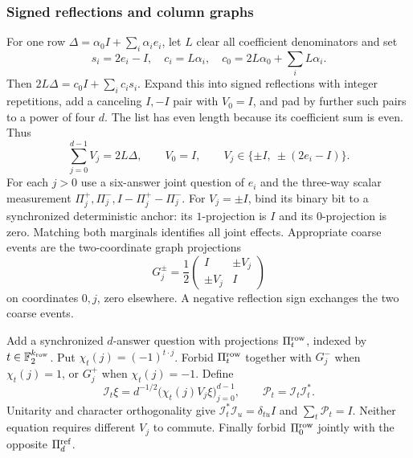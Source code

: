 \subsubsection{Signed reflections and column graphs}
For one row $\Delta=\alpha_0I+\sum_i\alpha_ie_i$, let $L$ clear all coefficient denominators and set
\[
 s_i=2e_i-I,\quad c_i=L\alpha_i,\quad
 c_0=2L\alpha_0+\sum_iL\alpha_i.
\]
Then $2L\Delta=c_0I+\sum_ic_is_i$. Expand this into signed reflections with integer repetitions, add a canceling $I,-I$ pair with $V_0=I$, and pad by further such pairs to a power of four $d$. The list has even length because its coefficient sum is even. Thus
\begin{equation}\label{eq:slots}
 \sum_{j=0}^{d-1}V_j=2L\Delta,\qquad V_0=I,\qquad
 V_j\in\{\pm I,\ \pm(2e_i-I)\}.
\end{equation}
For each $j>0$ use a six-answer joint question of $e_i$ and the three-way scalar measurement $\Pi_j^+,\Pi_j^-,I-\Pi_j^+-\Pi_j^-$. For $V_j=\pm I$, bind its binary bit to a synchronized deterministic anchor: its $1$-projection is $I$ and its $0$-projection is zero. Matching both marginals identifies all joint effects. Appropriate coarse events are the two-coordinate graph projections
\[
 G_j^\pm=\frac12\begin{pmatrix}I&\pm V_j\\\pm V_j&I\end{pmatrix}
\]
on coordinates $0,j$, zero elsewhere. A negative reflection sign exchanges the two coarse events.

Add a synchronized $d$-answer question with projections $\Pi^{\rm row}_t$, indexed by $t\in\mathbb F_2^{k_{\rm row}}$. Put $\chi_t(j)=(-1)^{t\cdot j}$. Forbid $\Pi^{\rm row}_t$ together with $G_j^-$ when $\chi_t(j)=1$, or $G_j^+$ when $\chi_t(j)=-1$. Define
\[
 \mathcal I_t\xi=d^{-1/2}\bigl(\chi_t(j)V_j\xi\bigr)_{j=0}^{d-1},
 \qquad \mathcal P_t=\mathcal I_t\mathcal I_t^*.
\]
Unitarity and character orthogonality give $\mathcal I_t^*\mathcal I_u=\delta_{tu}I$ and $\sum_t\mathcal P_t=I$. Neither equation requires different $V_j$ to commute. Finally forbid $\Pi^{\rm row}_0$ jointly with the opposite $\Pi^{\rm ref}_d$.

